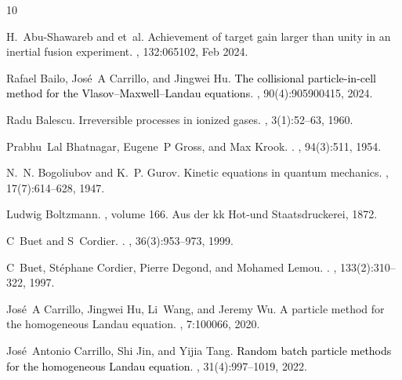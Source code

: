 \documentclass[preprint,1p,times]{elsarticle}
\theoremstyle{definition}
\theoremstyle{remark}
\newcommand{\tcr}[1]{\textcolor{black}{#1}}
\begin{document}
\begin{thebibliography}{10}

H.~Abu-Shawareb and et~al.
\newblock Achievement of target gain larger than unity in an inertial fusion
  experiment.
, 132:065102, Feb 2024.

Rafael Bailo, Jos{\'e}~A Carrillo, and Jingwei Hu.
\newblock \tcr{The collisional particle-in-cell method for the
  {V}lasov--{M}axwell--{L}andau equations}.
, 90(4):905900415, 2024.

Radu Balescu.
\newblock Irreversible processes in ionized gases.
, 3(1):52--63, 1960.

Prabhu~Lal Bhatnagar, Eugene~P Gross, and Max Krook.
.
, 94(3):511, 1954.

N.~N. Bogoliubov and K.~P. Gurov.
\newblock Kinetic equations in quantum mechanics.
, 17(7):614--628, 1947.

Ludwig Boltzmann.
, volume 166.
\newblock Aus der kk Hot-und Staatsdruckerei, 1872.

C~Buet and S~Cordier.
.
, 36(3):953--973, 1999.

C~Buet, St{\'e}phane Cordier, Pierre Degond, and Mohamed Lemou.
.
, 133(2):310--322, 1997.

Jos{\'e}~A Carrillo, Jingwei Hu, Li~Wang, and Jeremy Wu.
\newblock A particle method for the homogeneous {L}andau equation.
, 7:100066, 2020.

Jos{\'e}~Antonio Carrillo, Shi Jin, and Yijia Tang.
\newblock \tcr{Random batch particle methods for the homogeneous {L}andau
  equation}.
, 31(4):997--1019, 2022.


\end{thebibliography}
\end{document}
